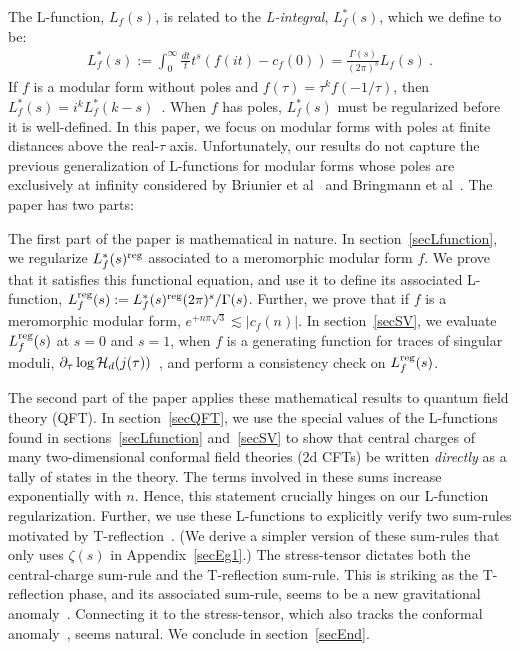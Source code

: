 \documentclass[11pt,a4paper]{article}
\newcommand{\G}{\Gamma}
\newcommand{\reg}{{\rm reg}}
\begin{document}
The L-function, $L_f(s)$, is related to the {\em L-integral}, $L_f^*(s)$, which we define to be:
\begin{align}
L_f^*(s):= \int_0^{\infty} \frac{dt}{t} t^s(f(it) -c_f(0)) = \frac{\G(s)}{(2\pi)^s} L_f(s)~.
\end{align}
If $f$ is a modular form without poles and $f(\tau) = \tau^k f(-1/\tau)$, then $L_f^*(s) = i^k L_f^*(k-s)$~\cite{01-Apostol}. When $f$ has poles, $L_f^*(s)$ must be regularized before it is well-defined. In this paper, we focus on modular forms with poles at finite distances above the real-$\tau$ axis. Unfortunately, our results do not capture the previous generalization of L-functions for modular forms whose poles are exclusively at infinity considered by Briunier et al~\cite{03-BFI} and Bringmann et al~\cite{04-BFK, 05-BFK2}. The paper has two parts: 

The first part of the paper is mathematical in nature. In section~\ref{secLfunction}, we regularize $L_f^*(s)^\reg$ associated to a meromorphic modular form $f$. We prove that it satisfies this functional equation, and use it to define its associated L-function, $L_f^\reg(s):= L_f^*(s)^\reg (2 \pi)^s/\G(s)$. Further, we prove that if $f$ is a meromorphic modular form, $e^{+n \pi \sqrt{3}} \lesssim |c_f(n)|$. In section~\ref{secSV}, we evaluate $L_f^\reg(s)$ at $s = 0$ and $s = 1$, when $f$ is a generating function for traces of singular moduli, $\partial_{\tau} \log {\cal H}_d(j(\tau))$~\cite{02-TSM}, and perform a consistency check on $L_f^\reg(s)$. 

The second part of the paper applies these mathematical results to quantum field theory (QFT). In section~\ref{secQFT}, we use the special values of the L-functions found in sections~\ref{secLfunction} and~\ref{secSV} to show that central charges of many two-dimensional conformal field theories (2d CFTs) be written {\em directly} as a tally of states in the theory. The terms involved in these sums increase exponentially with $n$. Hence, this statement crucially hinges on our L-function regularization. Further, we use these L-functions to explicitly verify two sum-rules motivated by T-reflection~\cite{06T-rex1, 07T-rex2}. (We derive a simpler version of these sum-rules that only uses $\zeta(s)$ in Appendix~\ref{secEg1}.) The stress-tensor dictates both the central-charge sum-rule and the T-reflection sum-rule. This is striking as the T-reflection phase, and its associated sum-rule, seems to be a new gravitational anomaly~\cite{06T-rex1, 07T-rex2}. Connecting it to the stress-tensor, which also tracks the conformal anomaly~\cite{08-Yellow}, seems natural. We conclude in section~\ref{secEnd}.
\end{document}
